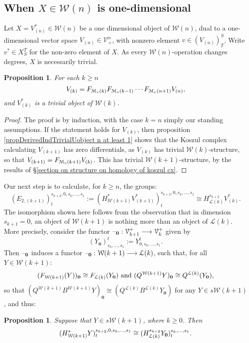 \documentclass[11pt]{amsart}
\theoremstyle{plain}
\newtheorem{prop}[thm]{Proposition}
\theoremstyle{definition}
\newcommand{\DASH}{\textup{--}}
\renewcommand{\to}{\longrightarrow}
\newcommand{\calW}{\mathcal{W}}
\newcommand{\calL}{\mathcal{L}}
\newcommand{\calV}{\mathcal{V}}
\newcommand{\calM}{\mathcal{M}}
\theoremstyle{plain}
\newcommand{\vect}[2]{\calV^{#1}_{#2}}
\begin{document}
\begin{Calculations of HWn for n nonzero}
\subsection{When $X\in\calW(n)$ is one-dimensional}
Let $X=V^*_{(n)}\in\calW(n)$ be a one dimensional object of $\calW(n)$, %
dual to a one-dimensional vector space $V_{(n)}\in\vect{n}{+}$, with nonzero element $v\in(V_{(n)})^S_T$. Write $v^*\in X^T_{S}$ for the non-zero element of $X$. As every $\calW(n)$-operation changes degrees, $X$ is necessarily trivial.
\begin{prop}\label{iterative calc of the Vk all trivial}
For each $k\geq n$
\[V_{(k)}=F_{\calM_\textup{v}(k)}F_{\calM_\textup{v}(k-1)}\cdots F_{\calM_\textup{v}(n+1)}V_{(n)},\]
and $V_{(k)}^*$ is a trivial object of $\calW(k)$.
\end{prop}
\begin{proof}
The proof is by induction, with the case $k=n$ simply our standing assumptions. If the statement holds for $V_{(k)}$, then proposition \ref{propDerivedIndTrivialUobject n at least 1} shows that the Koszul complex calculating $V_{(k+1)}$ has zero differentials, as $V_{(k)}$ has trivial $\calW(k)$-structure, so that $V_{(k+1)}=F_{\calM_{\textup{v}}(k+1)}V_{(k)}$. This has trivial $\calW(k+1)$-structure, by the results of \S\ref{section on structure on homology of koszul cx}.
\end{proof}
Our next step is to calculate, for $k\geq n$, the groups:
\[(E_{2,(k+1)})^{s_{k+2},0,s_k,\ldots,s_1}_{t}:=(H^*_{\calW(k+1)}V^*_{(k+1)})^{s_{k+2},0,s_k,\ldots,s_1}_{t}\cong H^{s_{k+2}}_{\calL(k)}V_{(k)}^*.\]
The isomorphism shown here follows from the observation that in dimension $s_{k+1}=0$, an object of $\calW(k+1)$ is nothing more than an object of $\calL(k)$. More precisely, consider the functor $\DASH_\textbf{0}:\vect{+}{k+1}\to \vect{+}{k}$ given by
\[(Y_\textbf{0})^t_{s_k,\ldots,s_1}:=Y^t_{0,s_k,\ldots,s_1}.\]
Then $\DASH_\textbf{0}$ induces a functor $\DASH_\textbf{0}:\calW(k+1)\to \calL(k)$, such that, for all $Y\in\calW(k+1)$:
\[(F_{\calW(k+1)}(Y))_\textbf{0}\cong F_{\calL(k)}(Y_\textbf{0})\textup{ and }(Q^{\calW(k+1)}Y)_\textbf{0}\cong Q^{\calL(k)}(Y_\textbf{0}),\]
so that $(Q^{\calW(k+1)}B^{\calW(k+1)}Y)_{\textbf{0}}\cong(Q^{\calL(k)}B^{\calL(k)}Y_{\textbf{0}})$ for any $Y\in s\calW(k+1)$, and thus:
\begin{prop}
Suppose that $Y\in s\calW(k+1)$, where $k\geq0$. Then
\[(H^*_{\calW(k+1)}Y)^{s_{k+2},0,s_k,\ldots,s_1}_{t}\cong (H^{s_{k+2}}_{\calL(k)}Y_\textup{\textbf{0}})^{s_k,\ldots,s_1}_t.\]

\end{prop}
\end{Calculations of HWn for n nonzero}
\end{document}
